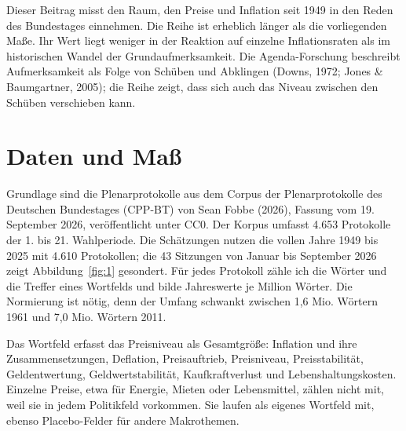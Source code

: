 \documentclass[11pt,a4paper]{article}
\begin{document}
Dieser Beitrag misst den Raum, den Preise und Inflation seit 1949 in den Reden des Bundestages einnehmen. Die Reihe ist erheblich länger als die vorliegenden Maße. Ihr Wert liegt weniger in der Reaktion auf einzelne Inflationsraten als im historischen Wandel der Grundaufmerksamkeit. Die Agenda-Forschung beschreibt Aufmerksamkeit als Folge von Schüben und Abklingen (Downs, 1972; Jones \& Baumgartner, 2005); die Reihe zeigt, dass sich auch das Niveau zwischen den Schüben verschieben kann.

\section{Daten und Maß}

Grundlage sind die Plenarprotokolle aus dem Corpus der Plenarprotokolle des Deutschen Bundestages (CPP-BT) von Sean Fobbe (2026), Fassung vom 19. September 2026, veröffentlicht unter CC0. Der Korpus umfasst 4.653 Protokolle der 1. bis 21. Wahlperiode. Die Schätzungen nutzen die vollen Jahre 1949 bis 2025 mit 4.610 Protokollen; die 43 Sitzungen von Januar bis September 2026 zeigt Abbildung~\ref{fig:1} gesondert. Für jedes Protokoll zähle ich die Wörter und die Treffer eines Wortfelds und bilde Jahreswerte je Million Wörter. Die Normierung ist nötig, denn der Umfang schwankt zwischen 1,6 Mio. Wörtern 1961 und 7,0 Mio. Wörtern 2011.

Das Wortfeld erfasst das Preisniveau als Gesamtgröße: Inflation und ihre Zusammensetzungen, Deflation, Preisauftrieb, Preisniveau, Preisstabilität, Geldentwertung, Geldwertstabilität, Kaufkraftverlust und Lebenshaltungskosten. Einzelne Preise, etwa für Energie, Mieten oder Lebensmittel, zählen nicht mit, weil sie in jedem Politikfeld vorkommen. Sie laufen als eigenes Wortfeld mit, ebenso Placebo-Felder für andere Makrothemen.
\end{document}
